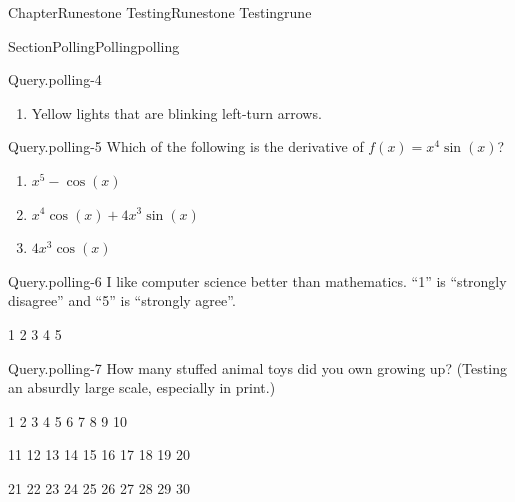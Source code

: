 \documentclass[oneside,10pt,]{book}
\numberwithin{equation}{section}
\begin{document}
\begin{chapterptx}{Chapter}{Runestone Testing}{}{Runestone Testing}{}{}{rune}
\begin{sectionptx}{Section}{Polling}{}{Polling}{}{}{polling}
\begin{paragraphs}{Query.}{polling-4}
\begin{enumerate}
%
\item{}Yellow lights that are blinking left-turn arrows.%
%
\end{enumerate}
%
\end{paragraphs}%
\begin{paragraphs}{Query.}{polling-5}%
Which of the following is the derivative of \(f(x)=x^4\sin(x)\)?%
\par
%
\begin{enumerate}
\item{}\(x^5 - \cos(x)\)%
%
\item{}\(x^4\cos(x) + 4x^3\sin(x)\)%
%
\item{}\(4x^3\cos(x)\)%
%
\end{enumerate}
%
\end{paragraphs}%
\begin{paragraphs}{Query.}{polling-6}%
I like computer science better than mathematics.  ``1'' is ``strongly disagree'' and ``5'' is ``strongly agree''.%
\begin{preformatted}
1  2  3  4  5
\end{preformatted}
\end{paragraphs}%
\begin{paragraphs}{Query.}{polling-7}%
How many stuffed animal toys did you own growing up?  (Testing an absurdly large scale, especially in print.)%
\begin{preformatted}
1  2  3  4  5  6  7  8  9  10

11  12  13  14  15  16  17  18  19  20

21  22  23  24  25  26  27  28  29  30


\end{preformatted}
\end{paragraphs}
\end{sectionptx}
\end{chapterptx}
\end{document}
